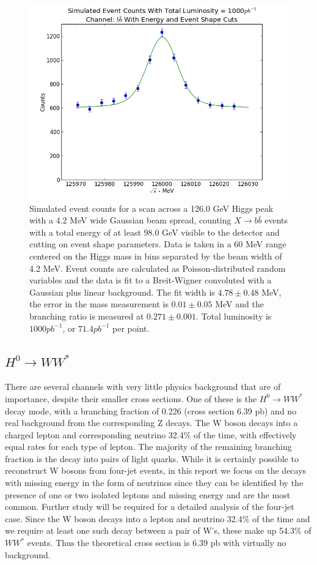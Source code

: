\documentclass[a4paper]{article}
\begin{document}
\begin{figure}
	\includegraphics[width=\textwidth]{data-fit-bbbar-cut}
	\caption{Simulated event counts for a scan across a 126.0 GeV Higgs peak with a 4.2 MeV wide Gaussian beam spread, counting $X\rightarrow b\bar{b}$ events with a total energy of at least 98.0 GeV visible to the detector and cutting on event shape parameters. Data is taken in a 60 MeV range centered on the Higgs mass in bins separated by the beam width of 4.2 MeV. Event counts are calculated as Poisson-distributed random variables and the data is fit to a Breit-Wigner convoluted with a Gaussian plus linear background. The fit width is $4.78\pm0.48$ MeV, the error in the mass measurement is $0.01\pm0.05$ MeV and the branching ratio is measured at $0.271\pm0.001$. Total luminosity is $1000pb^{-1}$, or $71.4 pb^{-1}$ per point.}
\label{data-fit-bbbar-cut}
\end{figure}

\subsection{$H^0\rightarrow WW^*$}
There are several channels with very little physics background that are of importance, despite their smaller cross sections. One of these is the $H^0\rightarrow WW^*$ decay mode, with a branching fraction of 0.226 (cross section 6.39 pb) and no real background from the corresponding Z decays. The W boson decays into a charged lepton and corresponding neutrino 32.4\% of the time, with effectively equal rates for each type of lepton. The majority of the remaining branching fraction is the decay into pairs of light quarks. While it is certainly possible to reconstruct W bosons from four-jet events, in this report we focus on the decays with missing energy in the form of neutrinos since they can be identified by the presence of one or two isolated leptons and missing energy and are the most common. Further study will be required for a detailed analysis of the four-jet case. Since the W boson decays into a lepton and neutrino 32.4\% of the time and we require at least one such decay between a pair of W's, these make up 54.3\% of $WW^*$ events. Thus the theoretical cross section is 6.39 pb with virtually no background.
\end{document}
